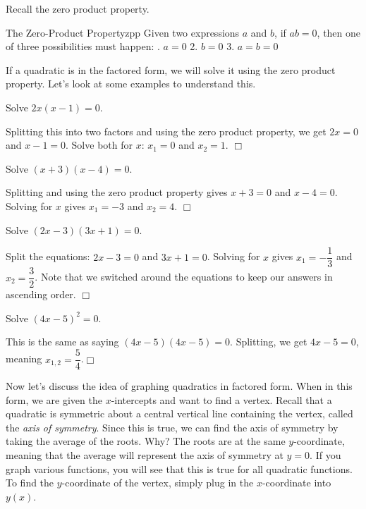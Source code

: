 \documentclass[lang=en,11pt]{elegantbook}
\begin{document}
Recall the zero product property.
\begin{theorem}{The Zero-Product Property}{zpp}
Given two expressions $a$ and $b$, if $ab=0$, then one of three possibilities must happen: \newline 
{.  $a=0$ \hspace{35mm} 2.  $b=0$ \hspace{35mm} 3.  $a=b=0$}
\end{theorem}
If a quadratic is in the factored form, we will solve it using the zero product property.  Let's look at some examples to understand this.
\begin{example}
Solve $2x(x-1)=0$.
\end{example}
\begin{solution}
Splitting this into two factors and using the zero product property, we get $2x=0$ and $x-1=0$.  Solve both for $x$: $x_1=0$ and $x_2=1$.  $\Box$
\end{solution}
\begin{example}
Solve $(x+3)(x-4)=0$.
\end{example}
\begin{solution}
Splitting and using the zero product property gives $x+3=0$ and $x-4=0$.  Solving for $x$ gives $x_1=-3$ and $x_2=4$.  $\Box$
\end{solution}
\begin{example}
Solve $(2x-3)(3x+1)=0$.
\end{example}
\begin{solution}
Split the equations: $2x-3=0$ and $3x+1=0$.  Solving for $x$ gives $x_1=-\dfrac{1}{3}$ and $x_2=\dfrac{3}{2}$.  Note that we switched around the equations to keep our answers in ascending order.  $\Box$
\end{solution}
\begin{example}
Solve $(4x-5)^2=0$.
\end{example}
\begin{solution}
This is the same as saying $(4x-5)(4x-5)=0$.  Splitting, we get $4x-5=0$, meaning $x_{1,2}=\dfrac{5}{4}$.$\Box$
\end{solution}
Now let's discuss the idea of graphing quadratics in factored form.  When in this form, we are given the $x$-intercepts and want to find a vertex.  Recall that a quadratic is symmetric about a central vertical line containing the vertex, called the \textit{axis of symmetry}.  Since this is true, we can find the axis of symmetry by taking the average of the roots.  Why?  The roots are at the same $y$-coordinate, meaning that the average will represent the axis of symmetry at $y=0$.  If you graph various functions, you will see that this is true for all quadratic functions.  To find the $y$-coordinate of the vertex, simply plug in the $x$-coordinate into $y(x)$.  
\end{document}
